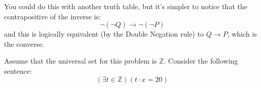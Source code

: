 \documentclass[addpoints]{exam}
\begin{document}
\begin{questions}
\begin{parts}
	\begin{solution}
		You could do this with another truth table, but it's simpler to notice that the contrapositive of the inverse is: 
		\[ \neg (\neg Q) \rightarrow \neg (\neg P) \]
and this is logically equivalent (by the Double Negation rule) to $Q \rightarrow P$, which is the converse. 
	\end{solution}	
		
		
	\end{parts}


 





\question Assume that the universal set for this problem is $\mathbb{Z}$. Consider the following sentence: 
\[ (\exists t \in \mathbb{Z})(t \cdot x = 20) \]
	\begin{parts}

\end{parts}
\end{questions}
\end{document}
